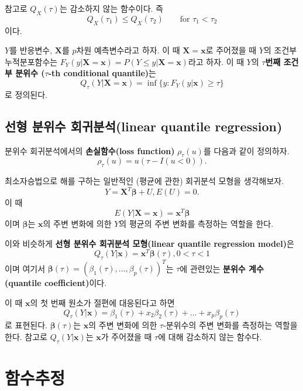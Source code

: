 \documentclass[b5paper,]{book}
\theoremstyle{definition}
\theoremstyle{definition}
\theoremstyle{definition}
\theoremstyle{remark}
\let\BeginKnitrBlock\begin \let\EndKnitrBlock\end
\begin{document}
참고로 \(Q_{X}(\tau)\)는 감소하지 않는 함수이다. 즉
\[Q_{X}(\tau_{1}) \leq Q_{X}(\tau_{2}) \qquad{ \text{for } \tau_{1} < \tau_{2}}\]
이다.

\BeginKnitrBlock{definition}[조건부 분위수]
\protect\hypertarget{def:unnamed-chunk-171}{}{\label{def:unnamed-chunk-171}
{} }\(Y\)를 반응변수, \(\mathbf{X}\)를
\(p\)차원 예측변수라고 하자. 이 때 \(\mathbf{X}=\mathbf{x}\)로 주어졌을
때 \(Y\)의 조건부 누적분포함수는
\(F_{Y}(y|\mathbf{X}=\mathbf{x})=P(Y\leq y|\mathbf{X}=\mathbf{x})\)라고
하자. 이 때 \(Y\)의 \(\tau\)\textbf{번째 조건부 분위수
(}\(\tau\)\textbf{-th conditional quantile)}는
\[Q_{\tau}(Y|\mathbf{X}=\mathbf{x})=\inf\{y:F_{Y}(y|\mathbf{x})\geq \tau\}\]
로 정의된다.
\EndKnitrBlock{definition}

\section{선형 분위수 회귀분석(linear quantile
regression)}\label{--linear-quantile-regression}

분위수 회귀분석에서의 \textbf{손실함수(loss function)}
\(\rho_{\tau}(u)\)를 다음과 같이 정의하자.
\[\rho_{\tau}(u)=u(\tau -I(u<0)).\]

최소자승법으로 해를 구하는 일반적인 (평균에 관한) 회귀분석 모형을
생각해보자. \[Y=\mathbf{X}^{T}\boldsymbol{\beta}+U, E(U)=0.\] 이 때
\[E(Y|\mathbf{X}=\mathbf{x})=\mathbf{x}^{T}\boldsymbol{\beta}\] 이며
\(\boldsymbol{\beta}\)는 \(\mathbf{x}\)의 주변 변화에 의한 \(Y\)의
평균의 주변 변화를 측정하는 역할을 한다.

이와 비슷하게 \textbf{선형 분위수 회귀분석 모형(linear quantile
regression model)}은
\[Q_{\tau}(Y|\mathbf{x})=\mathbf{x}^{T}\boldsymbol{\beta}(\tau), 0<\tau <1\]
이며 여기서
\(\boldsymbol{\beta}(\tau)=(\beta_{1}(\tau),\ldots , \beta_{p}(\tau))^{T}\)는
\(\tau\)에 관련있는 \textbf{분위수 계수(quantile coefficient)}이다.

이 때 \(\mathbf{x}\)의 첫 번째 원소가 절편에 대응된다고 하면
\[Q_{\tau}(Y|\mathbf{x})=\beta_{1}(\tau)+x_{2}\beta_{2}(\tau)+\ldots +x_{p}\beta_{p}(\tau)\]
로 표현된다. \(\boldsymbol{\beta}(\tau)\)는 \(\mathbf{x}\)의 주변 변화에
의한 \(\tau\)-분위수의 주변 변화를 측정하는 역할을 한다. 참고로
\(Q_{\tau}(Y|\mathbf{x})\)는 \(\mathbf{x}\)가 주어졌을 때 \(\tau\)에
대해 감소하지 않는 함수다.

\chapter{함수추정}\label{functionestimation}
\end{document}
